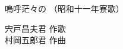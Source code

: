 \documentclass[10pt,b5j]{tarticle} %
\begin{document}
\begin{minipage}[c]{0.7\hsize} %
    \begin{center}
        {\LARGE
            嗚呼茫々の %
        }
        {\small 
            （昭和十一年寮歌） %
        }
    \end{center}
\end{minipage}
\begin{minipage}[c]{0.3\hsize} %
    \begin{flushright} %
        宍戸昌夫君 作歌\\村岡五郎君 作曲 %
    \end{flushright}
\end{minipage}
\end{document}
